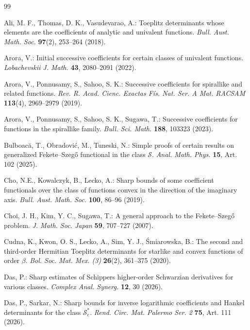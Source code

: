 \documentclass[11pt,reqno]{amsart}
\numberwithin{equation}{section}
\begin{document}
\begin{thebibliography}{99}

Ali, M. F., Thomas, D. K., Vasudevarao, A.: 
Toeplitz determinants whose elements are the coefficients of analytic and univalent functions. 
\textit{Bull. Aust. Math. Soc.} \textbf{97}(2), 253--264 (2018).

Arora, V.:
Initial successive coefficients for certain classes of univalent functions.
\textit{Lobachevskii J. Math.} \textbf{43}, 2080--2091 (2022).

Arora, V., Ponnusamy, S., Sahoo, S. K.:
Successive coefficients for spirallike and related functions.
\textit{Rev. R. Acad. Cienc. Exactas F\'is. Nat. Ser. A Mat. RACSAM} \textbf{113}(4), 2969--2979 (2019).

Arora, V., Ponnusamy, S., Sahoo, S. K., Sugawa, T.:
Successive coefficients for functions in the spirallike family.
\textit{Bull. Sci. Math.} \textbf{188}, 103323 (2023).

Bulboac\u{a}, T., Obradovi\'c, M., Tuneski, N.: 
Simple proofs of certain results on generalized Fekete--Szeg\H{o} functional in the class $\mathcal{S}$. 
\textit{Anal. Math. Phys.} \textbf{15}, Art. 102 (2025).

Cho, N.E., Kowalczyk, B., Lecko, A.:
Sharp bounds of some coefficient functionals over the class of functions convex in the direction of the imaginary axis.
\textit{Bull. Aust. Math. Soc.} \textbf{100}, 86--96 (2019).

Choi, J. H., Kim, Y. C., Sugawa, T.:
A general approach to the Fekete--Szeg\H{o} problem.
\textit{J. Math. Soc. Japan} \textbf{59}, 707--727 (2007).

Cudna, K., Kwon, O. S., Lecko, A., Sim, Y. J., \'{S}miarowska, B.:
The second and third-order Hermitian Toeplitz determinants for starlike and convex functions of order $\beta$.
\textit{Bol. Soc. Mat. Mex. (3)} \textbf{26}(2), 361--375 (2020).

Das, P.:
Sharp estimates of Schippers higher-order Schwarzian derivatives for various classes.
\textit{Complex Anal. Synerg.} \textbf{12}, 30 (2026).

Das, P., Sarkar, N.:
Sharp bounds for inverse logarithmic coefficients and Hankel determinants for the class $\mathcal{S}_{e}^{*}$.
\textit{Rend. Circ. Mat. Palermo Ser. 2} \textbf{75}, Art. 111 (2026).


\end{thebibliography}
\end{document}
